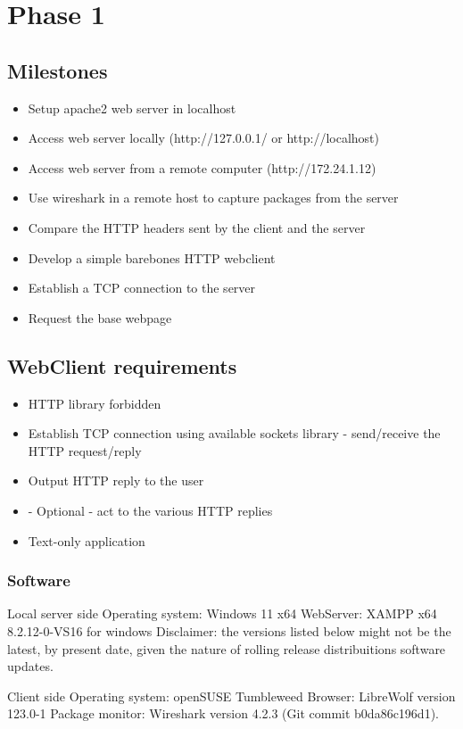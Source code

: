 \documentclass[11pt,a4paper]{report}
\begin{document}
\chapter{Phase 1}
    \section{Milestones}
        \begin{itemize}
            \item Setup apache2 web server in localhost
            \item Access web server locally (http://127.0.0.1/ or http://localhost)
            \item Access web server from a remote computer (http://172.24.1.12)
            \item Use wireshark in a remote host to capture packages from the server
            \item Compare the HTTP headers sent by the client and the server
            \item Develop a simple barebones HTTP webclient
            \item Establish a TCP connection to the server
            \item Request the base webpage
        \end{itemize}
        
    \section{WebClient requirements}
        \begin{itemize}
            \item HTTP library forbidden
            \item Establish TCP connection using available sockets library - send/receive the HTTP request/reply
            \item Output HTTP reply to the user
            \item - Optional - act to the various HTTP replies
            \item Text-only application
        \end{itemize}

    \subsection{Software}
        \item Local server side
            \subitem Operating system: Windows 11 x64
            \subitem WebServer: XAMPP x64 8.2.12-0-VS16 for windows
        Disclaimer: the versions listed below might not be the latest, by present date, given the nature of rolling release distribuitions software updates.
        \item Client side
            \subitem Operating system: openSUSE Tumbleweed
            \subitem Browser: LibreWolf version 123.0-1
            \subitem Package monitor: Wireshark version 4.2.3 (Git commit b0da86c196d1).
    
\end{document}
